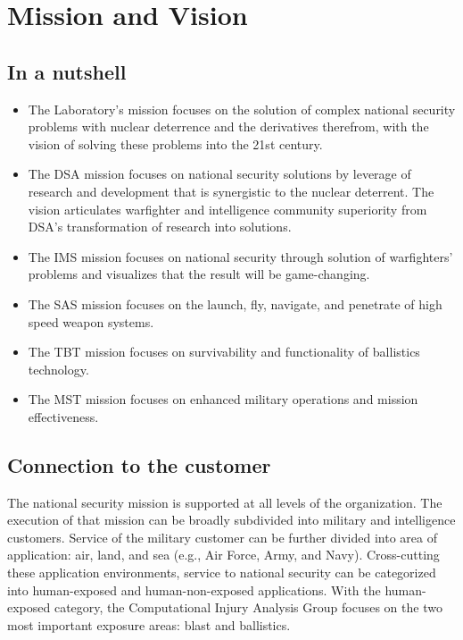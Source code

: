 \documentclass[12pt,reqno]{amsart}
\begin{document}
\section{Mission and Vision}
\subsection{In a nutshell}
\begin{itemize}
\item The Laboratory's mission focuses on the solution of complex national
security problems with nuclear deterrence and the derivatives therefrom, 
with the vision of solving these problems into the 21st century.
\item The DSA mission focuses on national security solutions by 
leverage of research and development that is synergistic to the 
nuclear deterrent. 
The vision articulates warfighter and intelligence community superiority 
from DSA's transformation of research into solutions. 
\item The IMS mission focuses on national security through solution of
warfighters' problems and visualizes that the result will be game-changing.
\item The SAS mission focuses on the launch, fly, navigate, and penetrate
of high speed weapon systems.
\item The TBT mission focuses on survivability and functionality of 
ballistics technology.  
\item The MST mission focuses on enhanced military operations and mission
effectiveness.
\end{itemize}

\subsection{Connection to the customer}
The national security mission is supported at all levels of the 
organization.  The execution of that mission can be broadly  
subdivided into military and intelligence customers.  Service of 
the military customer can be further divided into 
area of application: air, land, and sea (e.g., Air Force, Army, and
Navy).  Cross-cutting these application environments, 
service to national security can be 
categorized into human-exposed and human-non-exposed applications.  
With the human-exposed category, the 
Computational Injury Analysis Group focuses on the two most 
important exposure areas:  blast and ballistics.  
\end{document}
